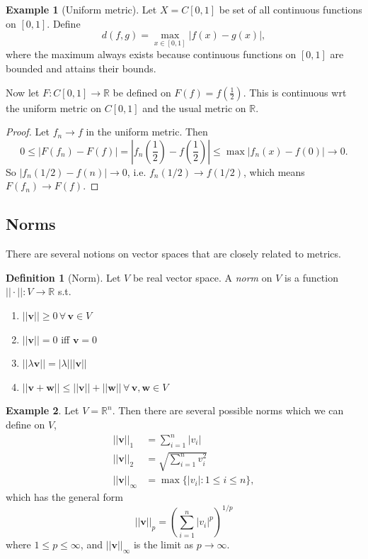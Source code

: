 \documentclass[a4paper,11pt]{article}
\theoremstyle{definition}
\newtheorem*{defn}{Definition}
\newtheorem*{ex}{Example}
\numberwithin{equation}{section}
\begin{document}
\begin{ex}[Uniform metric]
Let $X=C[0,1]$ be set of all continuous functions on $[0,1]$. Define
\begin{equation}
    d(f,g)=\max_{x\in[0,1]}|f(x)-g(x)|,
\end{equation}
where the maximum always exists because continuous functions on $[0,1]$ are bounded and attains their bounds.

Now let $F:C[0,1]\rightarrow\mathbb{R}$ be defined on $F(f)=f(\frac{1}{2})$. This is continuous wrt the uniform metric on $C[0,1]$ and the usual metric on $\mathbb{R}$.
\begin{proof}
Let $f_n\rightarrow f$ in the uniform metric. Then
\begin{equation}
    0\leq|F(f_n)-F(f)|=|f_n(\frac{1}{2})-f(\frac{1}{2})|\leq\max|f_n(x)-f(0)|\rightarrow0.
\end{equation}
So $|f_n(1/2)-f(n)|\rightarrow0$, i.e. $f_n(1/2)\rightarrow f(1/2)$, which means $F(f_n)\rightarrow F(f)$.
\end{proof}
\end{ex}

\subsection{Norms}
There are several notions on vector spaces that are closely related to metrics.
\begin{defn}[Norm]
Let $V$ be real vector space. A \emph{norm} on $V$ is a function $||\cdot||:V\rightarrow\mathbb{R}$ s.t.
\begin{enumerate}
    \item $||\mathbf{v}||\geq0\,\forall\,\mathbf{v}\in V$
    \item $||\mathbf{v}||=0$ iff $\mathbf{v}=0$
    \item $||\lambda\mathbf{v}||=|\lambda|||\mathbf{v}||$
    \item $||\mathbf{v}+\mathbf{w}||\leq||\mathbf{v}||+||\mathbf{w}||\,\forall\,\mathbf{v},\mathbf{w}\in V$
\end{enumerate}
\end{defn}

\begin{ex}
Let $V=\mathbb{R}^n$. Then there are several possible norms which we can define on $V$,
\begin{align}
    ||\mathbf{v}||_1 &= \sum_{i=1}^n|v_i|\\
    ||\mathbf{v}||_2 &= \sqrt{\sum_{i=1}^n v_i^2}\\
    ||\mathbf{v}||_\infty &= \max\{|v_i|:1\leq i \leq n\},
\end{align}
which has the general form
\begin{equation}
    ||\mathbf{v}||_p=\left(\sum_{i=1}^n|v_i|^p\right)^{1/p}
\end{equation}
where $1\leq p\leq\infty$, and $||\mathbf{v}||_\infty$ is the limit as $p\rightarrow\infty$.
\end{ex}
\end{document}
